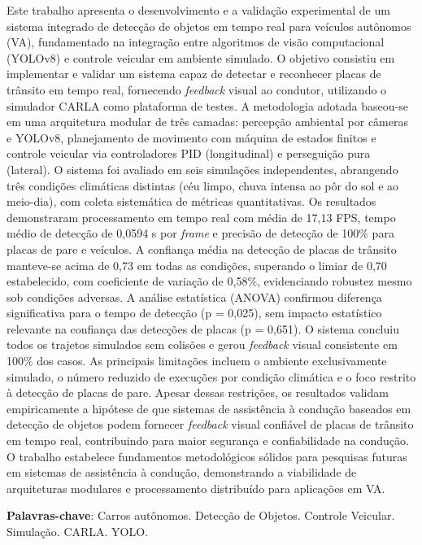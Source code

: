 \documentclass[
	12pt,				%
	oneside, %
	a4paper,			%
	english,			%
	french,				%
	spanish,			%
	brazil				%
	]{abntex2}
\begin{document}
\begin{resumo}
Este trabalho apresenta o desenvolvimento e a validação experimental de um sistema integrado de detecção de objetos em tempo real para veículos autônomos (VA), fundamentado na integração entre algoritmos de visão computacional (YOLOv8) e controle veicular em ambiente simulado. O objetivo consistiu em implementar e validar um sistema capaz de detectar e reconhecer placas de trânsito em tempo real, fornecendo \textit{feedback} visual ao condutor, utilizando o simulador CARLA como plataforma de testes. A metodologia adotada baseou-se em uma arquitetura modular de três camadas: percepção ambiental por câmeras e YOLOv8, planejamento de movimento com máquina de estados finitos e controle veicular via controladores PID (longitudinal) e perseguição pura (lateral). O sistema foi avaliado em seis simulações independentes, abrangendo três condições climáticas distintas (céu limpo, chuva intensa ao pôr do sol e ao meio-dia), com coleta sistemática de métricas quantitativas. Os resultados demonstraram processamento em tempo real com média de 17,13 FPS, tempo médio de detecção de 0,0594 s por \textit{frame} e precisão de detecção de 100\% para placas de pare e veículos. A confiança média na detecção de placas de trânsito manteve-se acima de 0,73 em todas as condições, superando o limiar de 0,70 estabelecido, com coeficiente de variação de 0,58\%, evidenciando robustez mesmo sob condições adversas. A análise estatística (ANOVA) confirmou diferença significativa para o tempo de detecção (p = 0,025), sem impacto estatístico relevante na confiança das detecções de placas (p = 0,651). O sistema concluiu todos os trajetos simulados sem colisões e gerou \textit{feedback} visual consistente em 100\% dos casos. As principais limitações incluem o ambiente exclusivamente simulado, o número reduzido de execuções por condição climática e o foco restrito à detecção de placas de pare. Apesar dessas restrições, os resultados validam empiricamente a hipótese de que sistemas de assistência à condução baseados em detecção de objetos podem fornecer \textit{feedback} visual confiável de placas de trânsito em tempo real, contribuindo para maior segurança e confiabilidade na condução. O trabalho estabelece fundamentos metodológicos sólidos para pesquisas futuras em sistemas de assistência à condução, demonstrando a viabilidade de arquiteturas modulares e processamento distribuído para aplicações em VA.

\textbf{Palavras-chave}: Carros autônomos. Detecção de Objetos. Controle Veicular. Simulação. CARLA. YOLO.


\end{resumo}
\end{document}
